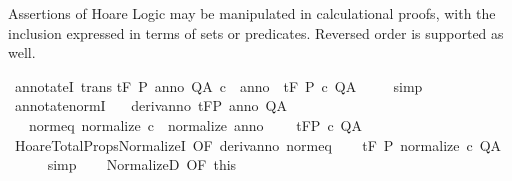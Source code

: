 \begin{isabellebody}
\begin{isamarkuptext}
 \medskip Assertions of Hoare Logic may be manipulated in
 calculational proofs, with the inclusion expressed in terms of sets
 or predicates.  Reversed order is supported as well.%
\end{isamarkuptext}\isamarkuptrue%
\isamarkupfalse%
\ annotateI\ {\isacharbrackleft}trans{\isacharbrackright}{\isacharcolon}\isanewline
{\isachardoublequoteopen}{\isasymlbrakk}{\isasymGamma}{\isacharcomma}{\isasymTheta}{\isasymturnstile}\isactrlsub t\isactrlbsub {\isacharslash}F\isactrlesub \ P\ anno\ Q{\isacharcomma}A{\isacharsemicolon}\ c\ {\isacharequal}\ anno{\isasymrbrakk}\ {\isasymLongrightarrow}\ {\isasymGamma}{\isacharcomma}{\isasymTheta}{\isasymturnstile}\isactrlsub t\isactrlbsub {\isacharslash}F\isactrlesub \ P\ c\ Q{\isacharcomma}A{\isachardoublequoteclose}\ \isanewline
%
\isadelimproof
\ \ %
\endisadelimproof
%
\isatagproof
{}\isamarkupfalse%
\ {\isacharparenleft}simp{\isacharparenright}%
\endisatagproof
{\isafoldproof}%
%
\isadelimproof
\isanewline
%
\endisadelimproof
\isanewline
{}\isamarkupfalse%
\ annotate{\isacharunderscore}normI{\isacharcolon}\isanewline
\ \ \ deriv{\isacharunderscore}anno{\isacharcolon}\ {\isachardoublequoteopen}{\isasymGamma}{\isacharcomma}{\isasymTheta}{\isasymturnstile}\isactrlsub t\isactrlbsub {\isacharslash}F\isactrlesub P\ anno\ Q{\isacharcomma}A{\isachardoublequoteclose}\ \isanewline
\ \ \ norm{\isacharunderscore}eq{\isacharcolon}\ {\isachardoublequoteopen}normalize\ c\ {\isacharequal}\ normalize\ anno{\isachardoublequoteclose}\ \isanewline
\ \ \ {\isachardoublequoteopen}{\isasymGamma}{\isacharcomma}{\isasymTheta}{\isasymturnstile}\isactrlsub t\isactrlbsub {\isacharslash}F\isactrlesub P\ c\ Q{\isacharcomma}A{\isachardoublequoteclose}\isanewline
%
\isadelimproof
%
\endisadelimproof
%
\isatagproof
{}\isamarkupfalse%
\ {\isacharminus}\isanewline
\ \ \isamarkupfalse%
\ HoareTotalProps{\isachardot}NormalizeI\ {\isacharbrackleft}OF\ deriv{\isacharunderscore}anno{\isacharbrackright}\ norm{\isacharunderscore}eq\isanewline
\ \ \isamarkupfalse%
\ {\isachardoublequoteopen}{\isasymGamma}{\isacharcomma}{\isasymTheta}{\isasymturnstile}\isactrlsub t\isactrlbsub {\isacharslash}F\ \isactrlesub P\ normalize\ c\ Q{\isacharcomma}A{\isachardoublequoteclose}\isanewline
\ \ \ \ \isamarkupfalse%
\ simp\isanewline
\ \ \isamarkupfalse%
\ NormalizeD\ {\isacharbrackleft}OF\ this{\isacharbrackright}\isanewline
\ \ \isamarkupfalse%

\end{isabellebody}
